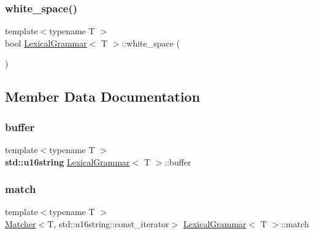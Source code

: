 \mbox{\label{class_lexical_grammar_aa8d7fdc84e7ca55c85c67b2849e89ac2}} 
\subsubsection{\texorpdfstring{white\+\_\+space()}{white\_space()}}
{\footnotesize\ttfamily template$<$typename T $>$ \\
bool \hyperlink{class_lexical_grammar}{Lexical\+Grammar}$<$ T $>$\+::white\+\_\+space (\begin{DoxyParamCaption}{ }\end{DoxyParamCaption})\hspace{0.3cm}{\ttfamily [inline]}}



\subsection{Member Data Documentation}
\mbox{\label{class_lexical_grammar_af23cc1b7472da117c7e39a8b8fe45e04}} 
\subsubsection{\texorpdfstring{buffer}{buffer}}
{\footnotesize\ttfamily template$<$typename T $>$ \\
\textbf{ std\+::u16string} \hyperlink{class_lexical_grammar}{Lexical\+Grammar}$<$ T $>$\+::buffer}

\mbox{\label{class_lexical_grammar_a868dc475274f55ff285fd26593f9d0a5}} 
\subsubsection{\texorpdfstring{match}{match}}
{\footnotesize\ttfamily template$<$typename T $>$ \\
\hyperlink{class_matcher}{Matcher}$<$T, std\+::u16string\+::const\+\_\+iterator$>$ \hyperlink{class_lexical_grammar}{Lexical\+Grammar}$<$ T $>$\+::match}

